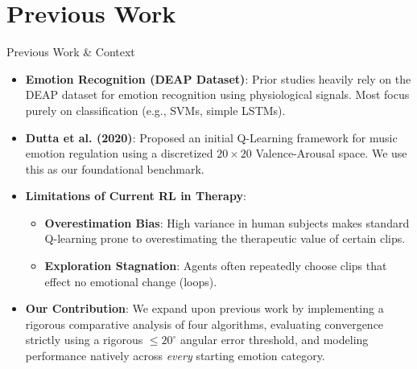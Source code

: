 \documentclass[10pt, aspectratio=169]{beamer}
\begin{document}
\section{Previous Work}
\begin{frame}{Previous Work \& Context}
    \begin{itemize}
        \item \textbf{Emotion Recognition (DEAP Dataset)}: Prior studies heavily rely on the DEAP dataset for emotion recognition using physiological signals. Most focus purely on classification (e.g., SVMs, simple LSTMs).
        \item \textbf{Dutta et al. (2020)}: Proposed an initial Q-Learning framework for music emotion regulation using a discretized $20 \times 20$ Valence-Arousal space. We use this as our foundational benchmark.
        \item \textbf{Limitations of Current RL in Therapy}:
        \begin{itemize}
            \item \textbf{Overestimation Bias}: High variance in human subjects makes standard Q-learning prone to overestimating the therapeutic value of certain clips.
            \item \textbf{Exploration Stagnation}: Agents often repeatedly choose clips that effect no emotional change (loops).
        \end{itemize}
        \item \textbf{Our Contribution}: We expand upon previous work by implementing a rigorous comparative analysis of four algorithms, evaluating convergence strictly using a rigorous $\leq 20^\circ$ angular error threshold, and modeling performance natively across \textit{every} starting emotion category.
    \end{itemize}
\end{frame}

\end{document}
